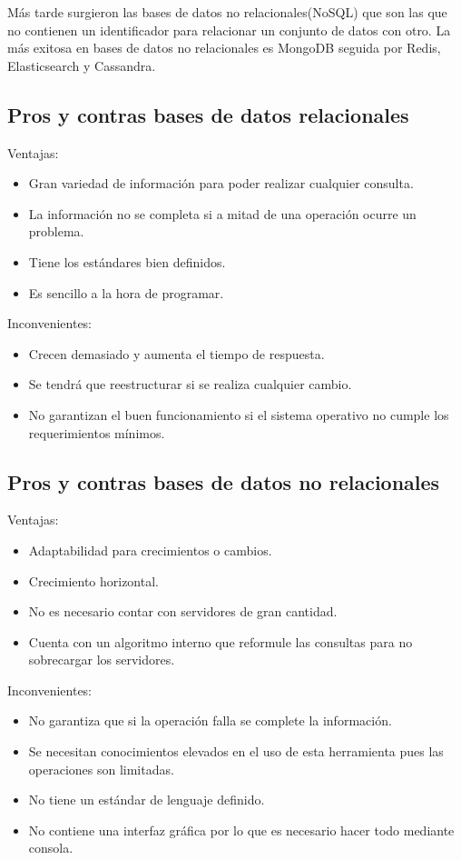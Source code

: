 \documentclass[12pt]{report} %
\begin{document}
	Más tarde surgieron las bases de datos no relacionales(NoSQL) que son las que no contienen un identificador para relacionar un conjunto de datos con otro.	
	La más exitosa en bases de datos no relacionales es MongoDB seguida por Redis, Elasticsearch y Cassandra.
	
	\subsection{Pros y contras bases de datos relacionales}
	Ventajas:
	 \begin{itemize}
		\item Gran variedad de información para poder realizar cualquier consulta.
		\item La información no se completa si a mitad de una operación ocurre un problema.
		\item Tiene los estándares bien definidos.
		\item Es sencillo a la hora de programar.
	\end{itemize}
	Inconvenientes:
		 \begin{itemize}
		\item Crecen demasiado y aumenta el tiempo de respuesta.
		\item	Se tendrá que reestructurar si se realiza cualquier cambio.
		\item 	No garantizan el buen funcionamiento si el sistema operativo no cumple los requerimientos mínimos.
	\end{itemize}

	\subsection{Pros y contras bases de datos no relacionales}
		Ventajas:
	\begin{itemize}
		\item Adaptabilidad para crecimientos o cambios.
		\item Crecimiento horizontal. 
		\item No es necesario contar con servidores de gran cantidad.
		\item Cuenta con un algoritmo interno que reformule las consultas para no sobrecargar los servidores.
	\end{itemize}
	Inconvenientes:
	\begin{itemize}
		\item No garantiza que si la operación falla se complete la información.
		\item	Se necesitan conocimientos elevados en el uso de esta herramienta pues las operaciones son limitadas.
		\item 	No tiene un estándar de lenguaje definido.
		\item 	No contiene una interfaz gráfica por lo que es necesario hacer todo mediante consola.
	\end{itemize}
\end{document}
